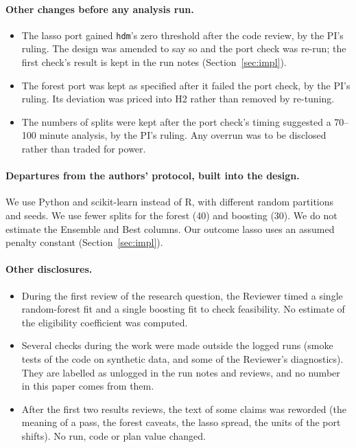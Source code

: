\documentclass[11pt]{article}
\newcommand{\var}[1]{\texttt{#1}}
\begin{document}
\paragraph{Other changes before any analysis run.}
\begin{itemize}
  \item The lasso port gained \var{hdm}'s zero threshold after the code review, by the
        PI's ruling. The design was amended to say so and the port check was re-run; the
        first check's result is kept in the run notes (Section~\ref{sec:impl}).
  \item The forest port was kept as specified after it failed the port check, by the
        PI's ruling. Its deviation was priced into H2 rather than removed by re-tuning.
  \item The numbers of splits were kept after the port check's timing suggested a 70--100
        minute analysis, by the PI's ruling. Any overrun was to be disclosed rather than
        traded for power.
\end{itemize}

\paragraph{Departures from the authors' protocol, built into the design.} We use
Python and scikit-learn instead of R, with different random partitions and seeds. We use
fewer splits for the forest (40) and boosting (30). We do not estimate the Ensemble and
Best columns. Our outcome lasso uses an assumed penalty constant (Section~\ref{sec:impl}).

\paragraph{Other disclosures.}
\begin{itemize}
  \item During the first review of the research question, the Reviewer timed a single
        random-forest fit and a single boosting fit to check feasibility. No estimate of
        the eligibility coefficient was computed.
  \item Several checks during the work were made outside the logged runs (smoke tests of
        the code on synthetic data, and some of the Reviewer's diagnostics). They are
        labelled as unlogged in the run notes and reviews, and no number in this paper
        comes from them.
  \item After the first two results reviews, the text of some claims was reworded (the
        meaning of a pass, the forest caveats, the lasso spread, the units of the port
        shifts). No run, code or plan value changed.
\end{itemize}
\end{document}
